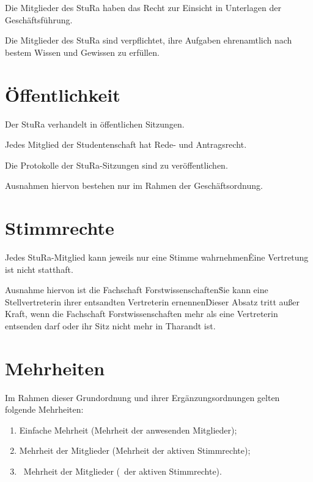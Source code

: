 \begin{multicols}{2}
\Abs \Satz Die Mitglieder des StuRa haben das Recht zur Einsicht in Unterlagen der Geschäftsführung.

\Abs \Satz Die Mitglieder des StuRa sind verpflichtet, ihre Aufgaben ehrenamtlich nach bestem Wissen und Gewissen zu erfüllen.



\section{Öffentlichkeit}

\Abs \Satz Der StuRa verhandelt in öffentlichen Sitzungen.

\Abs \Satz Jedes Mitglied der Studentenschaft hat Rede- und Antragsrecht.

\Abs \Satz Die Protokolle der StuRa-Sitzungen sind zu veröffentlichen.

\Abs \Satz Ausnahmen hiervon bestehen nur im Rahmen der Geschäftsordnung.



\section{Stimmrechte}

\Abs \Satz Jedes StuRa-Mitglied kann jeweils nur eine Stimme wahrnehmen\. Eine Vertretung ist nicht statthaft.

\Abs \Satz Ausnahme hiervon ist die Fachschaft Forstwissenschaften\. Sie kann eine Stellvertreterin ihrer entsandten Vertreterin ernennen\. Dieser Absatz tritt außer Kraft, wenn die Fachschaft Forstwissenschaften mehr als eine Vertreterin entsenden darf oder ihr Sitz nicht mehr in Tharandt ist.



\section{Mehrheiten}

\Abs \Satz Im Rahmen dieser Grundordnung und ihrer Ergänzungsordnungen gelten folgende Mehrheiten:
\begin{enumerate}
\item Einfache Mehrheit (Mehrheit der anwesenden Mitglieder);
\item Mehrheit der Mitglieder (Mehrheit der aktiven Stimmrechte);
\item {}~Mehrheit der Mitglieder (~der aktiven Stimmrechte).
\end{enumerate}


\end{multicols}
